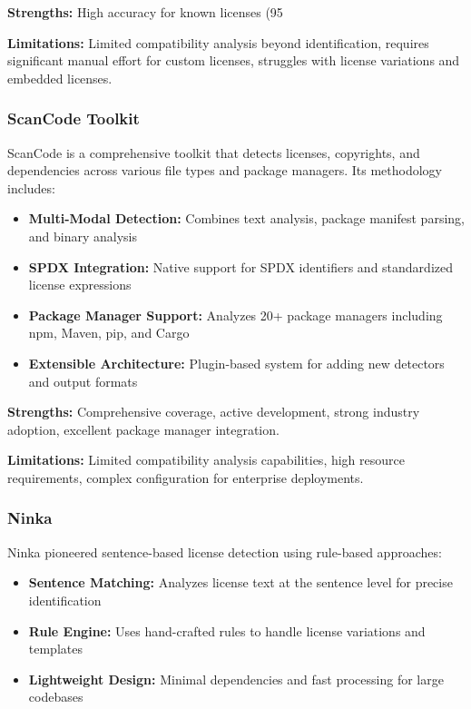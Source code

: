 \documentclass[9pt,twocolumn]{article}
\begin{document}
\textbf{Strengths:} High accuracy for known licenses (95%

\textbf{Limitations:} Limited compatibility analysis beyond identification, requires significant manual effort for custom licenses, struggles with license variations and embedded licenses.

\subsubsection{ScanCode Toolkit}
ScanCode \cite{scancode} is a comprehensive toolkit that detects licenses, copyrights, and dependencies across various file types and package managers. Its methodology includes:

\begin{itemize}
    \item \textbf{Multi-Modal Detection:} Combines text analysis, package manifest parsing, and binary analysis
    \item \textbf{SPDX Integration:} Native support for SPDX identifiers and standardized license expressions
    \item \textbf{Package Manager Support:} Analyzes 20+ package managers including npm, Maven, pip, and Cargo
    \item \textbf{Extensible Architecture:} Plugin-based system for adding new detectors and output formats
\end{itemize}

\textbf{Strengths:} Comprehensive coverage, active development, strong industry adoption, excellent package manager integration.

\textbf{Limitations:} Limited compatibility analysis capabilities, high resource requirements, complex configuration for enterprise deployments.

\subsubsection{Ninka}
Ninka \cite{german2010sentence} pioneered sentence-based license detection using rule-based approaches:

\begin{itemize}
    \item \textbf{Sentence Matching:} Analyzes license text at the sentence level for precise identification
    \item \textbf{Rule Engine:} Uses hand-crafted rules to handle license variations and templates
    \item \textbf{Lightweight Design:} Minimal dependencies and fast processing for large codebases
\end{itemize}
\end{document}
